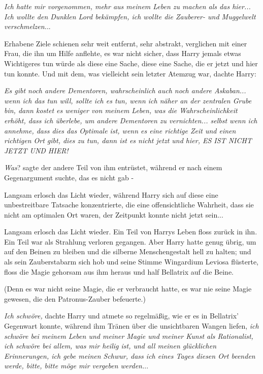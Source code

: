 \emph{ Ich hatte mir vorgenommen, mehr aus meinem Leben zu machen als das
hier... Ich wollte den Dunklen Lord bekämpfen, ich wollte die Zauberer- und
Muggelwelt verschmelzen.}..

Erhabene Ziele schienen sehr weit entfernt, sehr abstrakt, verglichen mit einer
Frau, die ihn um Hilfe anflehte, es war nicht sicher, dass Harry jemals etwas
Wichtigeres tun würde als diese eine Sache, diese eine Sache, die er jetzt und
hier tun konnte. Und mit dem, was vielleicht sein letzter Atemzug war, dachte
Harry:

\emph{Es gibt noch andere Dementoren, wahrscheinlich auch noch andere Askaban... wenn ich das tun will, sollte ich es tun, wenn ich näher an der zentralen Grube bin, dann kostet es weniger von meinem Leben, was die Wahrscheinlichkeit erhöht, dass ich überlebe, um andere Dementoren zu vernichten... selbst wenn ich annehme, dass dies das Optimale ist, wenn es eine richtige Zeit und einen richtigen Ort gibt, dies zu tun, dann ist es nicht jetzt und hier, ES IST NICHT JETZT UND HIER!}

\emph{Was}? sagte der andere Teil von ihm entrüstet, während er nach einem
Gegenargument suchte, das es nicht gab -

Langsam erlosch das Licht wieder, während Harry sich auf diese eine
unbestreitbare Tatsache konzentrierte, die eine offensichtliche Wahrheit, dass
sie nicht am optimalen Ort waren, der Zeitpunkt konnte nicht jetzt sein...

Langsam erlosch das Licht wieder. Ein Teil von Harrys Leben floss zurück in ihn.
Ein Teil war als Strahlung verloren gegangen. Aber Harry hatte genug übrig, um
auf den Beinen zu bleiben und die silberne Menschengestalt hell zu halten; und
als sein Zauberstabarm sich hob und seine Stimme \glqq Wingardium Leviosa\grqq{}
flüsterte, floss die Magie gehorsam aus ihm heraus und half Bellatrix auf die
Beine.

(Denn es war nicht seine Magie, die er verbraucht hatte, es war nie seine Magie
gewesen, die den Patronus-Zauber befeuerte.)

\emph{Ich schwöre, }dachte Harry und atmete so regelmäßig, wie er es in
Bellatrix' Gegenwart konnte, während ihm Tränen über die unsichtbaren Wangen
liefen,\emph{ ich schwöre bei meinem Leben und meiner Magie und meiner Kunst als
Rationalist, ich schwöre bei allem, was mir heilig ist, und all meinen
glücklichen Erinnerungen, ich gebe meinen Schwur, dass ich eines Tages diesen
Ort beenden werde, bitte, bitte möge mir vergeben werden.}..

